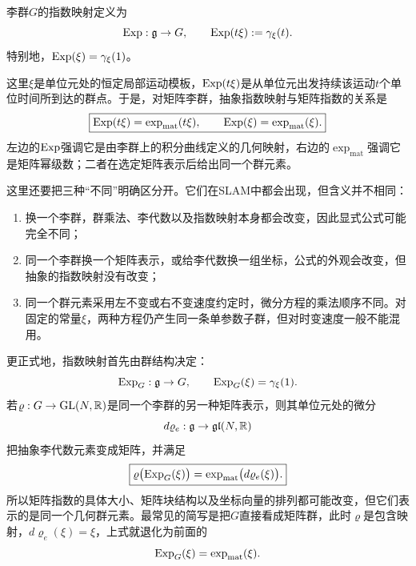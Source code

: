 \begin{definition}[指数映射]
李群$G$的指数映射定义为
\[
    \operatorname{Exp}:\mathfrak g\to G,
    \qquad
    \operatorname{Exp}(t\xi):=\gamma_\xi(t).
\]
特别地，$\operatorname{Exp}(\xi)=\gamma_\xi(1)$。
\end{definition}

这里$\xi$是单位元处的恒定局部运动模板，$\operatorname{Exp}(t\xi)$是从单位元出发持续该运动$t$个单位时间所到达的群点。于是，对矩阵李群，抽象指数映射与矩阵指数的关系是
\[
    \boxed{
    \operatorname{Exp}(t\xi)=\exp_{\mathrm{mat}}(t\xi),
    \qquad
    \operatorname{Exp}(\xi)=\exp_{\mathrm{mat}}(\xi).
    }
\]
左边的$\operatorname{Exp}$强调它是由李群上的积分曲线定义的几何映射，右边的$\exp_{\mathrm{mat}}$强调它是矩阵幂级数；二者在选定矩阵表示后给出同一个群元素。

这里还要把三种“不同”明确区分开。它们在SLAM中都会出现，但含义并不相同：
\begin{enumerate}
    \item 换一个李群，群乘法、李代数以及指数映射本身都会改变，因此显式公式可能完全不同；
    \item 同一个李群换一个矩阵表示，或给李代数换一组坐标，公式的外观会改变，但抽象的指数映射没有改变；
    \item 同一个群元素采用左不变或右不变速度约定时，微分方程的乘法顺序不同。对固定的常量$\xi$，两种方程仍产生同一条单参数子群，但对时变速度一般不能混用。
\end{enumerate}

更正式地，指数映射首先由群结构决定：
\[
    \operatorname{Exp}_G:\mathfrak g\to G,
    \qquad
    \operatorname{Exp}_G(\xi)=\gamma_\xi(1).
\]
若$\varrho:G\to\mathrm{GL}(N,\mathbb{R})$是同一个李群的另一种矩阵表示，则其单位元处的微分
\[
    d\varrho_e:\mathfrak g\to\mathfrak{gl}(N,\mathbb{R})
\]
把抽象李代数元素变成矩阵，并满足
\[
    \boxed{
    \varrho\bigl(\operatorname{Exp}_G(\xi)\bigr)
    =\exp_{\mathrm{mat}}\bigl(d\varrho_e(\xi)\bigr).
    }
\]
所以矩阵指数的具体大小、矩阵块结构以及坐标向量的排列都可能改变，但它们表示的是同一个几何群元素。最常见的简写是把$G$直接看成矩阵群，此时$\varrho$是包含映射，$d\varrho_e(\xi)=\xi$，上式就退化为前面的
\[
    \operatorname{Exp}_G(\xi)=\exp_{\mathrm{mat}}(\xi).
\]


